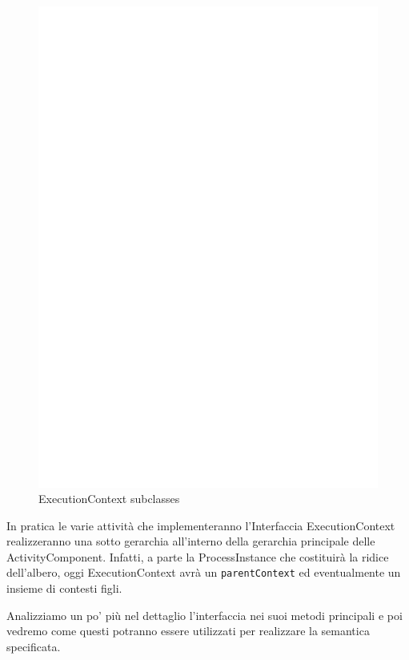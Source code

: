 \begin{figure}[tp]
\begin{center}
\includegraphics[scale=0.85]
{architettura_interna/dia/cntxclass}
\caption[ExecutionContext Class Diagram]{
   	\textsf{{\small ExecutionContext subclasses}} }
  \label{fig:cntxclass}
\end{center}
\end{figure}

In pratica le varie attività che implementeranno l'Interfaccia ExecutionContext
realizzeranno una sotto gerarchia all'interno della gerarchia principale delle
ActivityComponent. Infatti, a parte la ProcessInstance che costituirà la
ridice dell'albero, oggi ExecutionContext avrà un \texttt{parentContext} ed
eventualmente un insieme di contesti figli.

Analizziamo un po' più nel dettaglio l'interfaccia  nei
suoi metodi principali e poi vedremo come questi potranno essere utilizzati per
realizzare la semantica specificata.

